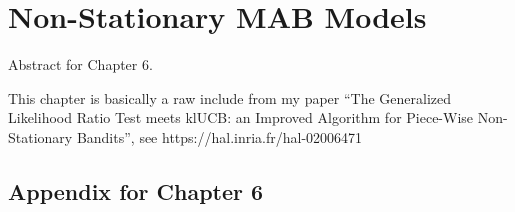 

\chapter{Non-Stationary MAB Models}
\label{chapter:6}
\minitoc

Abstract for Chapter 6.

\newpage
\graphicspath{{2-Chapters/6-Chapter/Images/}}

This chapter is basically a raw include from my paper ``The Generalized Likelihood Ratio Test meets klUCB: an Improved Algorithm for Piece-Wise Non-Stationary Bandits'', see https://hal.inria.fr/hal-02006471









\section{Appendix for Chapter 6}
\label{sec:6:appendix}


